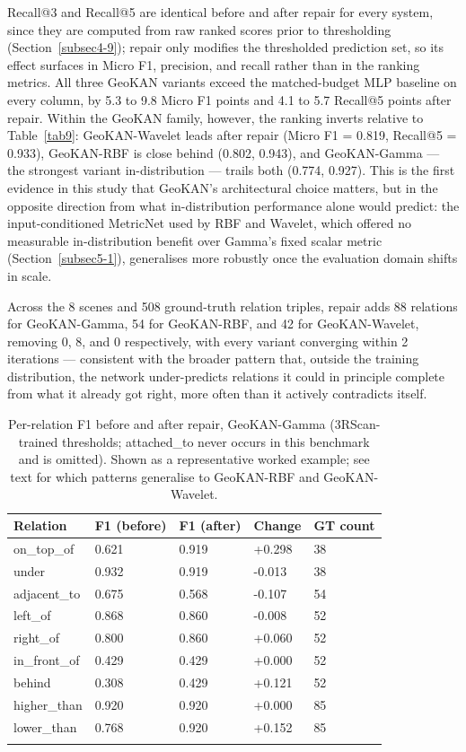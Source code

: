 \documentclass[sn-mathphys,Numbered]{sn-jnl}
\begin{document}
Recall@3 and Recall@5 are identical before and after repair for every system, since they are computed from raw ranked scores prior to thresholding (Section~\ref{subsec4-9}); repair only modifies the thresholded prediction set, so its effect surfaces in Micro F1, precision, and recall rather than in the ranking metrics. All three GeoKAN variants exceed the matched-budget MLP baseline on every column, by 5.3 to 9.8 Micro F1 points and 4.1 to 5.7 Recall@5 points after repair. Within the GeoKAN family, however, the ranking inverts relative to Table~\ref{tab9}: GeoKAN-Wavelet leads after repair (Micro F1 = 0.819, Recall@5 = 0.933), GeoKAN-RBF is close behind (0.802, 0.943), and GeoKAN-Gamma --- the strongest variant in-distribution --- trails both (0.774, 0.927). This is the first evidence in this study that GeoKAN's architectural choice matters, but in the opposite direction from what in-distribution performance alone would predict: the input-conditioned MetricNet used by RBF and Wavelet, which offered no measurable in-distribution benefit over Gamma's fixed scalar metric (Section~\ref{subsec5-1}), generalises more robustly once the evaluation domain shifts in scale.

Across the 8 scenes and 508 ground-truth relation triples, repair adds 88 relations for GeoKAN-Gamma, 54 for GeoKAN-RBF, and 42 for GeoKAN-Wavelet, removing 0, 8, and 0 respectively, with every variant converging within 2 iterations --- consistent with the broader pattern that, outside the training distribution, the network under-predicts relations it could in principle complete from what it already got right, more often than it actively contradicts itself.

\begin{table}[htbp]
\centering
\caption{Per-relation F1 before and after repair, GeoKAN-Gamma (3RScan-trained thresholds; attached\_to never occurs in this benchmark and is omitted). Shown as a representative worked example; see text for which patterns generalise to GeoKAN-RBF and GeoKAN-Wavelet.}\label{tab12}
\begin{tabular}{@{}lllll@{}}
\toprule
Relation & F1 (before) & F1 (after) & Change & GT count \\
\midrule
on\_top\_of & 0.621 & 0.919 & +0.298 & 38 \\
\midrule
under & 0.932 & 0.919 & -0.013 & 38 \\
\midrule
adjacent\_to & 0.675 & 0.568 & -0.107 & 54 \\
\midrule
left\_of & 0.868 & 0.860 & -0.008 & 52 \\
\midrule
right\_of & 0.800 & 0.860 & +0.060 & 52 \\
\midrule
in\_front\_of & 0.429 & 0.429 & +0.000 & 52 \\
\midrule
behind & 0.308 & 0.429 & +0.121 & 52 \\
\midrule
higher\_than & 0.920 & 0.920 & +0.000 & 85 \\
\midrule
lower\_than & 0.768 & 0.920 & +0.152 & 85 \\
\botrule
\end{tabular}
\end{table}
\end{document}
